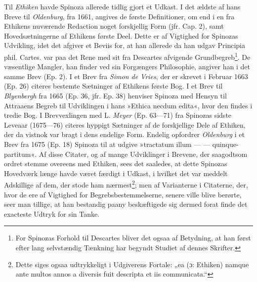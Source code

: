\documentclass[12pt,a4paper]{book}
\newcommand{\opage}[1]{\marginnote{\footnotesize\textit{[#1]}}}
\begin{document}
\opage{37} \setcounter{footnote}{0}%
Til \emph{Ethiken} havde Spinoza allerede tidlig gjort et Udkast. I det
ældste af hans Breve til \emph{Oldenburg}, fra 1661, angives de første
Definitioner, om end i en fra Ethikens nuværende Redaction noget
forskjellig Form (jfr. Cap. 2), samt Hovedsætningerne af Ethikens første
Deel. Dette er af Vigtighed for Spinozas Udvikling, idet det afgiver et
Beviis for, at han allerede da han udgav Principia phil. Cartes. var paa
det Rene med sit fra Descartes afvigende Grundbegreb\footnote{For Spinozas
Forhold til Descartes bliver det ogsaa af Betydning, at han først efter
lang selvstændig Tænkning har begyndt Studiet af dennes Skrifter.}. De
væsentlige Mangler, han finder ved sin Forgængers Philosophie, angiver han
i det samme Brev (Ep. 2). I et Brev fra \emph{Simon de Vries}, der er
skrevet i Februar 1663 (Ep. 26) citeres bestemte Sætninger af Ethikens
første Bog. I et Brev til \emph{Blyenbergh} fra 1665 (Ep. 36, jfr. Ep. 38)
henviser Spinoza med Hensyn til Attraaens Begreb til Udviklingen i hans
»Ethica necdum edita«, hvor den findes i tredie Bog. I Brevvexlingen med
L. \emph{Meyer} (Ep. 63---71) fra Spinozas sidste Leveaar (1675---76)
citeres hyppigt Sætninger af de forskjellige Dele af Ethiken, der da
vistnok var bragt i dens endelige Form. Endelig opfordrer
\emph{Oldenburg} i et Brev fra 1675 (Ep. 18) Spinoza til at udgive
»tractatum illum --- --- quinque-partitum«. Af disse Citater, og af mange
Udviklinger i Brevene, der saagodtsom ordret stemme overeens med Ethiken,
sees det saaledes, at dette Spinozas Hovedværk længe havde været færdigt i
Udkast, i hvilket det var meddelt Adskillige af dem, der stode ham
nærmest\footnote{Dette siges ogsaa udtrykkeligt i Udgiverens Fortale: „ea
(ɔ: Ethiken) namque ante multos annos a diversis fuit descripta et iis
communicata.“}; men af Varianterne i Citaterne, der, hvor de ere af
Vigtighed for Begrebsbestemmelserne, senere ville blive berørte, seer man
tillige, at han bestandig paany beskæftigede sig dermed forat finde det
exacteste Udtryk for sin Tanke.
\end{document}
